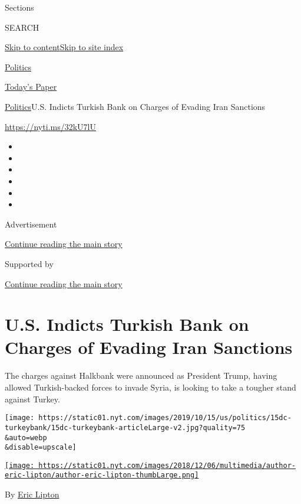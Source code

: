 Sections

SEARCH

\protect\hyperlink{site-content}{Skip to
content}\protect\hyperlink{site-index}{Skip to site index}

\href{https://www.nytimes.com/section/politics}{Politics}

\href{https://myaccount.nytimes.com/auth/login?response_type=cookie\&client_id=vi}{}

\href{https://www.nytimes.com/section/todayspaper}{Today's Paper}

\href{/section/politics}{Politics}\textbar{}U.S. Indicts Turkish Bank on
Charges of Evading Iran Sanctions

\url{https://nyti.ms/32kU7lU}

\begin{itemize}
\item
\item
\item
\item
\item
\item
\end{itemize}

Advertisement

\protect\hyperlink{after-top}{Continue reading the main story}

Supported by

\protect\hyperlink{after-sponsor}{Continue reading the main story}

\hypertarget{us-indicts-turkish-bank-on-charges-of-evading-iran-sanctions}{%
\section{U.S. Indicts Turkish Bank on Charges of Evading Iran
Sanctions}\label{us-indicts-turkish-bank-on-charges-of-evading-iran-sanctions}}

The charges against Halkbank were announced as President Trump, having
allowed Turkish-backed forces to invade Syria, is looking to take a
tougher stand against Turkey.

\texttt{[image: https://static01.nyt.com/images/2019/10/15/us/politics/15dc-turkeybank/15dc-turkeybank-articleLarge-v2.jpg?quality=75\\\&auto=webp\\\&disable=upscale]}

\href{https://www.nytimes.com/by/eric-lipton}{\texttt{[image: https://static01.nyt.com/images/2018/12/06/multimedia/author-eric-lipton/author-eric-lipton-thumbLarge.png]}}

By \href{https://www.nytimes.com/by/eric-lipton}{Eric Lipton}

